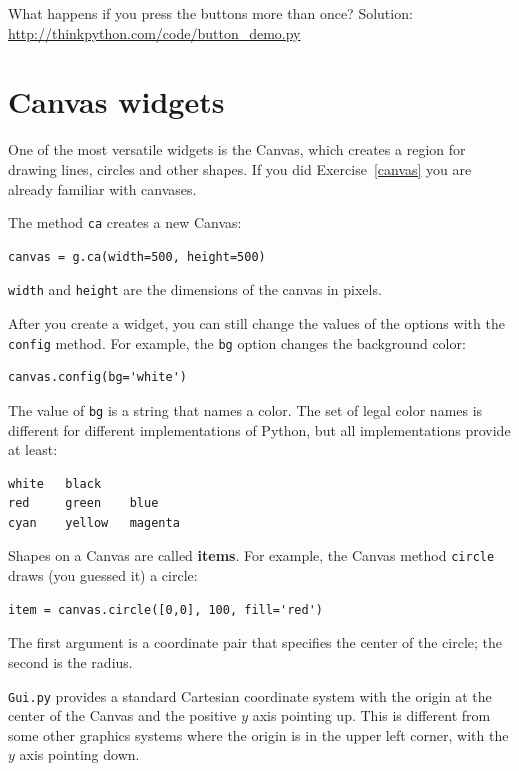 \documentclass[10pt]{book}
\begin{document}
\begin{CJK}{UTF8}{gbsn}
\begin{exercise}
What happens if you press the buttons more than once?
Solution: \url{http://thinkpython.com/code/button_demo.py}

\end{exercise}


\section{Canvas widgets}

One of the most versatile widgets is the Canvas, which creates
a region for drawing lines, circles and other shapes.  If you
did Exercise~\ref{canvas} you are already familiar with canvases.

The method {\tt ca} creates a new Canvas:

\begin{verbatim}
canvas = g.ca(width=500, height=500)
\end{verbatim}
%
{\tt width} and {\tt height} are the dimensions of the canvas
in pixels.  

After you create a widget, you can still change the values of
the options with the
{\tt config} method.  For example, the {\tt bg} option changes
the background color:

\begin{verbatim}
canvas.config(bg='white')
\end{verbatim}
%
The value of {\tt bg} is a string
that names a color.  The set of legal color names is different
for different implementations of Python, but all implementations
provide at least:

\begin{verbatim}
white   black
red     green    blue   
cyan    yellow   magenta
\end{verbatim}
%
Shapes on a Canvas are called {\bf items}.  For example,
the Canvas method {\tt circle} draws (you guessed it) a circle:

\begin{verbatim}
item = canvas.circle([0,0], 100, fill='red')
\end{verbatim}
%
The first argument is a coordinate pair that specifies the
center of the circle; the second is the radius.

{\tt Gui.py} provides a standard Cartesian coordinate system with
the origin at the center of the Canvas and the positive $y$ axis
pointing up.  This is different from some other graphics systems
where the origin is in the upper left corner, with the $y$ axis
pointing down.


\end{CJK}
\end{document}
